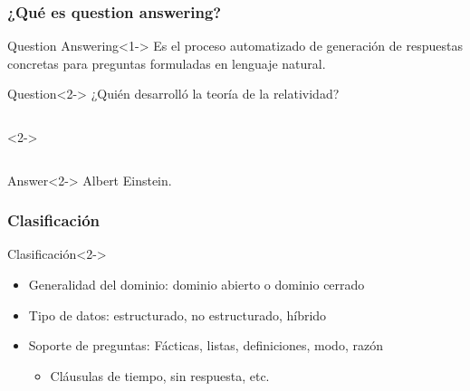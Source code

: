 \begin{frame}
  \frametitle{¿Qué es question answering?}
  \begin{block}{Question Answering}<1->
      Es el proceso automatizado de generación de respuestas concretas para preguntas formuladas en lenguaje natural.
  \end{block}
  \bigskip

 \begin{alertblock}{Question}<2->
      ¿Quién desarrolló la teoría de la relatividad?
  \end{alertblock}

  \begin{columns}<2->
      \begin{column}{.5\textwidth}
      \end{column}
      \begin{column}{.1\textwidth}
      \end{column}
      \begin{column}{.3\textwidth}
      \end{column}
      \begin{column}{.5\textwidth}

      \end{column}
  \end{columns}

  \begin{exampleblock}{Answer}<2->
      Albert Einstein.
  \end{exampleblock}
\end{frame}


\begin{frame}
  \frametitle{Clasificación}
  \begin{block}{Clasificación}<2->
    \begin{itemize}
      \item Generalidad del dominio: dominio abierto o dominio cerrado
      \item Tipo de datos: estructurado, no estructurado, híbrido
      \item Soporte de preguntas: Fácticas, listas, definiciones, modo, razón
      \begin{itemize}
          \item Cláusulas de tiempo, sin respuesta, etc.
      \end{itemize}
    \end{itemize}
  \end{block}
\end{frame}


